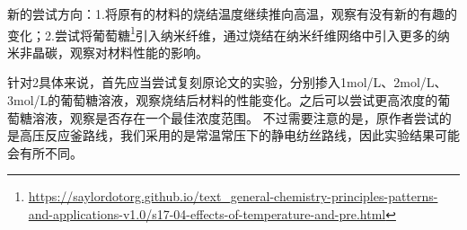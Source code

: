 新的尝试方向：1.将原有的材料的烧结温度继续推向高温，观察有没有新的有趣的变化；2.尝试将葡萄糖\footnote{\url{https://saylordotorg.github.io/text_general-chemistry-principles-patterns-and-applications-v1.0/s17-04-effects-of-temperature-and-pre.html}}引入纳米纤维，通过烧结在纳米纤维网络中引入更多的纳米非晶碳，观察对材料性能的影响。

针对2具体来说，首先应当尝试复刻原论文的实验\cite{du2019a}，分别掺入1mol/L、2mol/L、3mol/L的葡萄糖溶液，观察烧结后材料的性能变化。之后可以尝试更高浓度的葡萄糖溶液，观察是否存在一个最佳浓度范围。
不过需要注意的是，原作者尝试的是高压反应釜路线，我们采用的是常温常压下的静电纺丝路线，因此实验结果可能会有所不同。